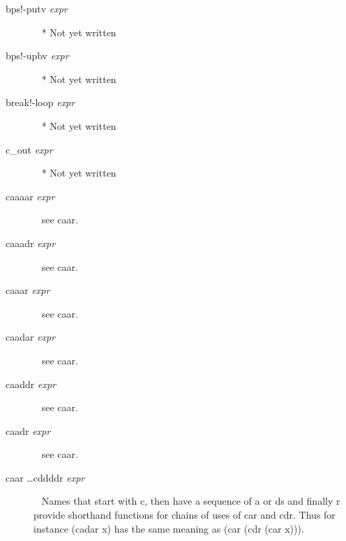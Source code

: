 \documentclass[a4paper,11pt]{article}
\begin{document}
\begin{description}
\item [{\ttfamily bps!-putv} {\itshape  expr}]  ~\newline
  * Not yet written

\item [{\ttfamily bps!-upbv} {\itshape  expr}]  ~\newline
  * Not yet written

\item [{\ttfamily break!-loop} {\itshape  expr}]  ~\newline
  * Not yet written

\item [{\ttfamily c\_out} {\itshape  expr}]  ~\newline
  * Not yet written

\item[{\ttfamily caaaar} {\itshape expr}]  ~\newline
see {\ttfamily caar}.

\item[{\ttfamily caaadr} {\itshape expr}]  ~\newline
see {\ttfamily caar}.

\item[{\ttfamily caaar} {\itshape expr}]  ~\newline
see {\ttfamily caar}.

\item[{\ttfamily caadar} {\itshape expr}]  ~\newline
see {\ttfamily caar}.

\item[{\ttfamily caaddr} {\itshape expr}]  ~\newline
see {\ttfamily caar}.

\item[{\ttfamily caadr} {\itshape expr}]  ~\newline
see {\ttfamily caar}.

\item [{\ttfamily caar \ldots cddddr} {\itshape expr}]  ~\newline
Names that start with {\ttfamily c}, then have a sequence of
{\ttfamily a} or {\ttfamily d}s and finally {\ttfamily r} provide
shorthand functions for chains of uses of {\ttfamily car} and
{\ttfamily cdr}. Thus for instance
{\ttfamily (cadar x)} has the same meaning as
{\ttfamily (car (cdr (car x)))}.


\end{description}
\end{document}
